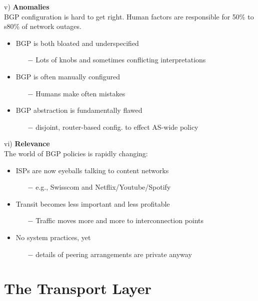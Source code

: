 \documentclass[a4paper, fontsize=8pt, landscape, DIV=1]{scrartcl}
\begin{document}
\begin{multicols*}{4}
		v) \textbf{Anomalies}\\
		BGP configuration is hard to get right. Human factors are responsible for 50\%
		to s80\% of network outages.
		\begin{itemize}[noitemsep]
			\item BGP is both bloated and underspecified
			\begin{itemize}
				\item[$-$] Lots of knobs and sometimes conflicting interpretations
			\end{itemize}
			\item BGP is often manually configured
			\begin{itemize}
				\item[$-$] Humans make often mistakes
			\end{itemize}
			\item BGP abstraction is fundamentally flawed
			\begin{itemize}
				\item[$-$] disjoint, router-based config. to effect AS-wide policy
			\end{itemize} 
		\end{itemize}
		\par 
		
		vi) \textbf{Relevance}\\
		The world of BGP policies is rapidly changing: 
		\begin{itemize}[noitemsep]
			\item ISPs are now eyeballs talking to content networks
			\begin{itemize}
				\item[$-$] e.g., Swisscom and Netflix/Youtube/Spotify
			\end{itemize}
			\item Transit becomes less important and less profitable
			\begin{itemize}
				\item[$-$] Traffic moves more and more to interconnection points
			\end{itemize}
			\item No system practices, yet 
			\begin{itemize}
				\item[$-$] details of peering arrangements are private anyway
			\end{itemize}
		\end{itemize}
		
		\section{The Transport Layer} 

\end{multicols*}
\end{document}
